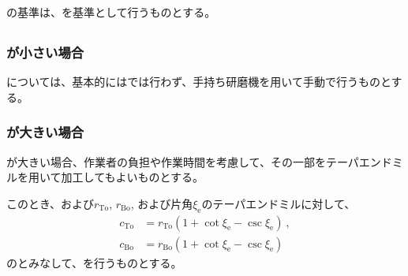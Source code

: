 \subsubsection{\EndFaceInRChamferMilling}
\EndFaceInRChamferMilling の基準は、\EndFaceIDCenter を基準として行うものとする。


\subsection{\EndFaceOutRChamferMilling}

\subsubsection{\EndFaceOutRChamferRadius が小さい場合}
\EndFaceOutRChamfer については、基本的には\MMC では行わず、手持ち研磨機を用いて手動で行うものとする。

\subsubsection{\EndFaceOutRChamferRadius が大きい場合}
\EndFaceOutRChamferRadius が大きい場合、作業者の負担や作業時間を考慮して、その一部をテーパエンドミルを用いて加工してもよいものとする。

このとき、\TopEndFaceOutRChamferRadius および\BottomEndFaceOutRChamferRadius$r_\mathrm{To}$, $r_\mathrm{Bo}$, および片角$\xi_\mathrm e$のテーパエンドミルに対して、
\begin{align*}
  c_\mathrm{To} &= r_\mathrm{To}\left(1+\cot\xi_\mathrm e-\csc\xi_\mathrm e\right)\ ,\\
  c_\mathrm{Bo} &= r_\mathrm{Bo}\left(1+\cot\xi_\mathrm e-\csc\xi_\mathrm e\right)
\end{align*}
の\EndFaceOutCChamferLength とみなして、\EndFaceInCChamferMilling を行うものとする。


